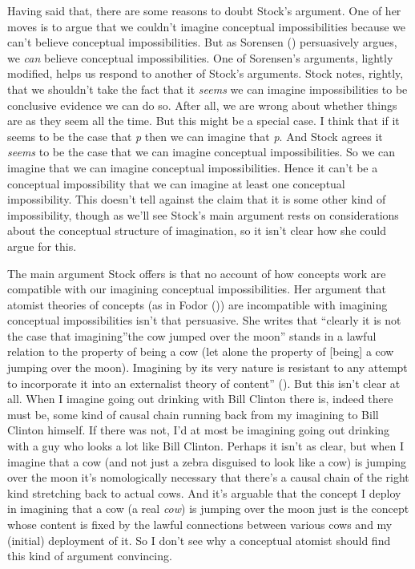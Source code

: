 \documentclass[
  11pt,
  letterpaper,
  DIV=11,
  numbers=noendperiod,
  twoside]{scrartcl}
\begin{document}
Having said that, there are some reasons to doubt Stock's argument. One
of her moves is to argue that we couldn't imagine conceptual
impossibilities because we can't believe conceptual impossibilities. But
as Sorensen () persuasively argues, we
\emph{can} believe conceptual impossibilities. One of Sorensen's
arguments, lightly modified, helps us respond to another of Stock's
arguments. Stock notes, rightly, that we shouldn't take the fact that it
\emph{seems} we can imagine impossibilities to be conclusive evidence we
can do so. After all, we are wrong about whether things are as they seem
all the time. But this might be a special case. I think that if it seems
to be the case that \emph{p} then we can imagine that \emph{p}. And
Stock agrees it \emph{seems} to be the case that we can imagine
conceptual impossibilities. So we can imagine that we can imagine
conceptual impossibilities. Hence it can't be a conceptual impossibility
that we can imagine at least one conceptual impossibility. This doesn't
tell against the claim that it is some other kind of impossibility,
though as we'll see Stock's main argument rests on considerations about
the conceptual structure of imagination, so it isn't clear how she could
argue for this.

The main argument Stock offers is that no account of how concepts work
are compatible with our imagining conceptual impossibilities. Her
argument that atomist theories of concepts (as in Fodor
()) are incompatible with imagining
conceptual impossibilities isn't that persuasive. She writes that
``clearly it is not the case that imagining''the cow jumped over the
moon'' stands in a lawful relation to the property of being a cow (let
alone the property of {[}being{]} a cow jumping over the moon).
Imagining by its very nature is resistant to any attempt to incorporate
it into an externalist theory of content''
(). But this isn't clear at all. When
I imagine going out drinking with Bill Clinton there is, indeed there
must be, some kind of causal chain running back from my imagining to
Bill Clinton himself. If there was not, I'd at most be imagining going
out drinking with a guy who looks a lot like Bill Clinton. Perhaps it
isn't as clear, but when I imagine that a cow (and not just a zebra
disguised to look like a cow) is jumping over the moon it's
nomologically necessary that there's a causal chain of the right kind
stretching back to actual cows. And it's arguable that the concept I
deploy in imagining that a cow (a real \emph{cow}) is jumping over the
moon just is the concept whose content is fixed by the lawful
connections between various cows and my (initial) deployment of it. So I
don't see why a conceptual atomist should find this kind of argument
convincing.
\end{document}
